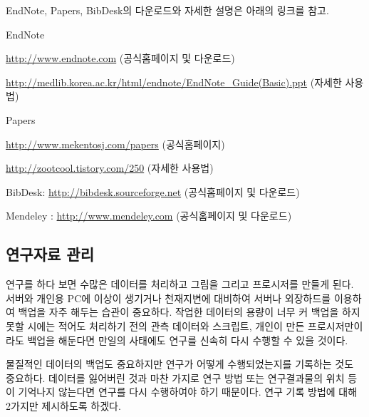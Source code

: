\begin{description}
  EndNote, Papers, BibDesk의 다운로드와 자세한 설명은 아래의 링크를 참고.
\begin{packed_item}
\item EndNote
\begin{packed_item}
\item \url{http://www.endnote.com} (공식홈페이지 및 다운로드)
\item \url{http://medlib.korea.ac.kr/html/endnote/EndNote_Guide(Basic).ppt}
  (자세한 사용법)
\end{packed_item}
\item Papers
\begin{packed_item}
\item \url{http://www.mekentosj.com/papers} (공식홈페이지)
\item \url{http://zootcool.tistory.com/250} (자세한 사용법)
\end{packed_item}
\item BibDesk: \url{http://bibdesk.sourceforge.net} (공식홈페이지 및 다운로드)
\item Mendeley : \url{http://www.mendeley.com} (공식홈페이지 및 다운로드)
\end{packed_item}

\end{description}

\subsection{연구자료 관리}
연구를 하다 보면 수많은 데이터를 처리하고 그림을 그리고 프로시저를 만들게
된다. 서버와 개인용 PC에 이상이 생기거나 천재지변에 대비하여 서버나 외장하드를
이용하여 백업을 자주 해두는 습관이 중요하다. 작업한 데이터의 용량이 너무 커
백업을 하지 못할 시에는 적어도 처리하기 전의 관측 데이터와 스크립트, 개인이 만든
프로시저만이라도 백업을 해둔다면 만일의 사태에도 연구를 신속히 다시 수행할 수
있을 것이다.

물질적인 데이터의 백업도 중요하지만 연구가 어떻게 수행되었는지를 기록하는 것도
중요하다. 데이터를 잃어버린 것과 마찬 가지로 연구 방법 또는 연구결과물의 위치
등이 기억나지 않는다면 연구를 다시 수행하여야 하기 때문이다. 연구 기록 방법에
대해 2가지만 제시하도록 하겠다.

